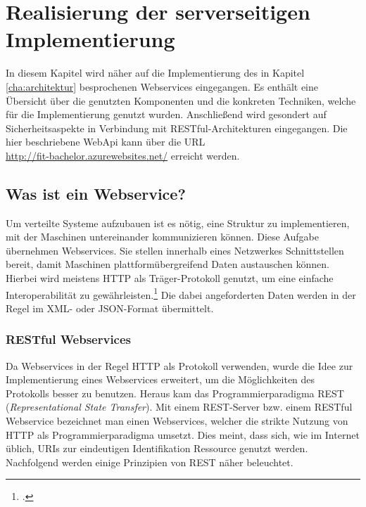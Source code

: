 \chapter{Realisierung der serverseitigen Implementierung}
\label{cha:server-impl}
In diesem Kapitel wird näher auf die Implementierung des in Kapitel \ref{cha:architektur} besprochenen Webservices eingegangen. Es enthält eine Übersicht über die genutzten Komponenten und die konkreten Techniken, welche für die Implementierung genutzt wurden. Anschließend wird gesondert auf Sicherheitsaspekte in Verbindung mit \ac{RESTful}-Architekturen eingegangen. Die hier beschriebene WebApi kann über die \ac{URL}\\ \href{http://fit-bachelor.azurewebsites.net/}{http://fit-bachelor.azurewebsites.net/} erreicht werden. 
\section{Was ist ein Webservice?}
\label{sec:definition-webservice}
Um verteilte Systeme aufzubauen ist es nötig, eine Struktur zu implementieren, mit der Maschinen untereinander kommunizieren können. Diese Aufgabe übernehmen Webservices. Sie stellen innerhalb eines Netzwerkes Schnittstellen bereit, damit Maschinen plattformübergreifend Daten austauschen können. Hierbei wird meistens \ac{HTTP} als Träger-Protokoll genutzt, um eine einfache Interoperabilität zu gewährleisten.\footcite{Definition-Webservice} Die dabei angeforderten Daten werden in der Regel im \ac{XML}- oder \ac{JSON}-Format übermittelt. 
\subsection{RESTful Webservices}
\label{sec:definition-rest}
Da Webservices in der Regel HTTP als Protokoll verwenden, wurde die Idee zur Implementierung eines Webservices erweitert, um die Möglichkeiten des Protokolls besser zu benutzen. Heraus kam das Programmierparadigma REST (\textit{Representational State Transfer}). Mit einem REST-Server bzw. einem RESTful Webservice bezeichnet man einen Webservices, welcher die strikte Nutzung von HTTP als Programmierparadigma umsetzt.  Dies meint, dass sich, wie im Internet üblich, \ac{URIs} zur eindeutigen Identifikation Ressource genutzt werden. Nachfolgend werden einige Prinzipien von REST näher beleuchtet.

